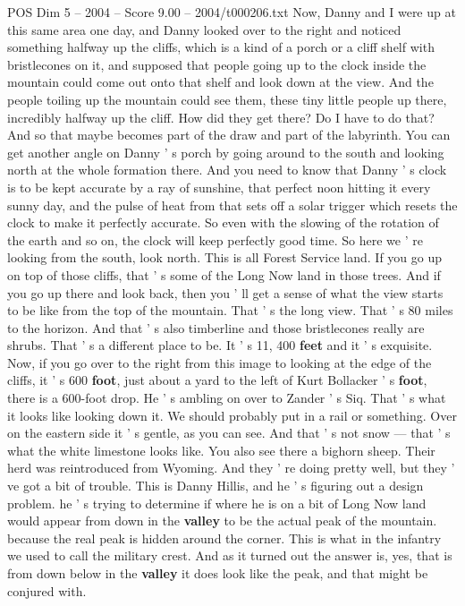 \begin{textsample}{POS Dim 5 – 2004 – Score 9.00 – 2004/t000206.txt}
Now, Danny and I were up at this same area one day, and Danny looked over to the right and noticed something halfway up the cliffs, which is a kind of a porch or a cliff shelf with bristlecones on it, and supposed that people going up to the clock inside the mountain could come out onto that shelf and look down at the view.
And the people toiling up the mountain could see them, these tiny little people up there, incredibly halfway up the cliff.
How did they get there?
Do I have to do that?
And so that maybe becomes part of the draw and part of the labyrinth.
You can get another angle on Danny ' s porch by going around to the south and looking north at the whole formation there.
And you need to know that Danny ' s clock is to be kept accurate by a ray of sunshine, that perfect noon hitting it every sunny day, and the pulse of heat from that sets off a solar trigger which resets the clock to make it perfectly accurate.
So even with the slowing of the rotation of the earth and so on, the clock will keep perfectly good time.
So here we ' re looking from the south, look north.
This is all Forest Service land.
If you go up on top of those cliffs, that ' s some of the Long Now land in those trees.
And if you go up there and look back, then you ' ll get a sense of what the view starts to be like from the top of the mountain.
That ' s the long view.
That ' s 80 miles to the horizon.
And that ' s also timberline and those bristlecones really are shrubs.
That ' s a different place to be.
It ' s 11, 400 \textbf{feet} and it ' s exquisite.
Now, if you go over to the right from this image to looking at the edge of the cliffs, it ' s 600 \textbf{foot}, just about a yard to the left of Kurt Bollacker ' s \textbf{foot}, there is a 600-foot drop.
He ' s ambling on over to Zander ' s Siq.
That ' s what it looks like looking down it.
We should probably put in a rail or something.
Over on the eastern side it ' s gentle, as you can see.
And that ' s not snow — that ' s what the white limestone looks like.
You also see there a bighorn sheep.
Their herd was reintroduced from Wyoming.
And they ' re doing pretty well, but they ' ve got a bit of trouble.
This is Danny Hillis, and he ' s figuring out a design problem. he ' s trying to determine if where he is on a bit of Long Now land would appear from down in the \textbf{valley} to be the actual peak of the mountain. because the real peak is hidden around the corner.
This is what in the infantry we used to call the military crest.
And as it turned out the answer is, yes, that is from down below in the \textbf{valley} it does look like the peak, and that might be conjured with.

\end{textsample}
